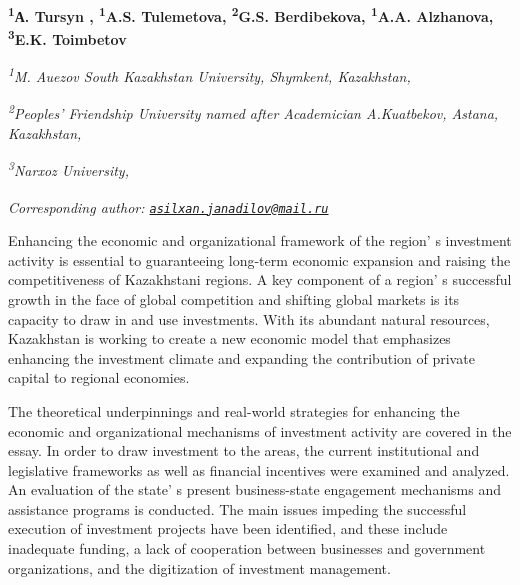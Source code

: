 
\begin{articleheader}

{\bfseries
\textsuperscript{1}А. Tursyn\textsuperscript{\envelope } \authorid,
\textsuperscript{1}A.S. Tulemetova\authorid,
\textsuperscript{2}G.S. Berdibekova\authorid,
\textsuperscript{1}A.A. Alzhanova\authorid,
\textsuperscript{3}E.K. Toimbetov\authorid}
\end{articleheader}

\begin{affiliation}
\emph{\textsuperscript{1}M. Auezov South Kazakhstan University, Shymkent, Kazakhstan,}

\emph{\textsuperscript{2}Peoples'{} Friendship University named after Academician A.Kuatbekov, Astana, Kazakhstan,}

\emph{\textsuperscript{3}Narxoz University,}

\raggedright \emph{{\bfseries \textsuperscript{\envelope }}{\em Corresponding author: \href{mailto:asilxan.janadilov@mail.ru}{\nolinkurl{asilxan.janadilov@mail.ru}}}}
\end{affiliation}

Enhancing the economic and organizational framework of the
region' s investment activity is essential to
guaranteeing long-term economic expansion and raising the
competitiveness of Kazakhstani regions. A key component of a
region' s successful growth in the face of global
competition and shifting global markets is its capacity to draw in and
use investments. With its abundant natural resources, Kazakhstan is
working to create a new economic model that emphasizes enhancing the
investment climate and expanding the contribution of private capital to
regional economies.

The theoretical underpinnings and real-world strategies for enhancing
the economic and organizational mechanisms of investment activity are
covered in the essay. In order to draw investment to the areas, the
current institutional and legislative frameworks as well as financial
incentives were examined and analyzed. An evaluation of the
state' s present business-state engagement mechanisms and
assistance programs is conducted. The main issues impeding the
successful execution of investment projects have been identified, and
these include inadequate funding, a lack of cooperation between
businesses and government \\organizations, and the digitization of
investment management.

